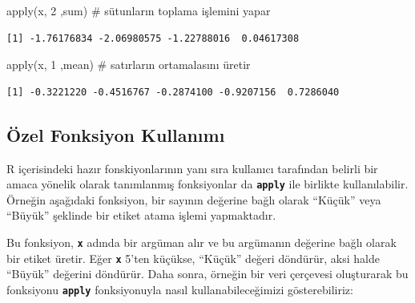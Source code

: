 \documentclass[
  letterpaper,
  DIV=11,
  numbers=noendperiod]{scrreprt}
\newenvironment{Shaded}{\begin{snugshade}}{\end{snugshade}}
\newcommand{\CommentTok}[1]{\textcolor[rgb]{0.37,0.37,0.37}{#1}}
\newcommand{\DecValTok}[1]{\textcolor[rgb]{0.68,0.00,0.00}{#1}}
\newcommand{\FunctionTok}[1]{\textcolor[rgb]{0.28,0.35,0.67}{#1}}
\newcommand{\NormalTok}[1]{\textcolor[rgb]{0.00,0.23,0.31}{#1}}
\begin{document}
\begin{Shaded}
\begin{Highlighting}[]
\FunctionTok{apply}\NormalTok{(x, }\DecValTok{2}\NormalTok{ ,sum) }\CommentTok{\# sütunların toplama işlemini yapar}
\end{Highlighting}
\end{Shaded}

\begin{verbatim}
[1] -1.76176834 -2.06980575 -1.22788016  0.04617308
\end{verbatim}

\begin{Shaded}
\begin{Highlighting}[]
\FunctionTok{apply}\NormalTok{(x, }\DecValTok{1}\NormalTok{ ,mean) }\CommentTok{\# satırların ortamalasını üretir}
\end{Highlighting}
\end{Shaded}

\begin{verbatim}
[1] -0.3221220 -0.4516767 -0.2874100 -0.9207156  0.7286040
\end{verbatim}

\subsection{Özel Fonksiyon
Kullanımı}\label{uxf6zel-fonksiyon-kullanux131mux131}

R içerisindeki hazır fonskiyonlarının yanı sıra kullanıcı tarafından
belirli bir amaca yönelik olarak tanımlanmış fonksiyonlar da
\textbf{\texttt{apply}} ile birlikte kullanılabilir. Örneğin aşağıdaki
fonksiyon, bir sayının değerine bağlı olarak ``Küçük'' veya ``Büyük''
şeklinde bir etiket atama işlemi yapmaktadır.

Bu fonksiyon, \textbf{\texttt{x}} adında bir argüman alır ve bu
argümanın değerine bağlı olarak bir etiket üretir. Eğer
\textbf{\texttt{x}} 5'ten küçükse, ``Küçük'' değeri döndürür, aksi halde
``Büyük'' değerini döndürür. Daha sonra, örneğin bir veri çerçevesi
oluşturarak bu fonksiyonu \textbf{\texttt{apply}} fonksiyonuyla nasıl
kullanabileceğimizi gösterebiliriz:
\end{document}
